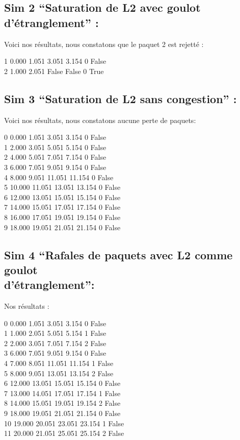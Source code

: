 \documentclass[a4paper, 12pt]{report}
\begin{document}
\subsection*{Sim 2 “Saturation de L2 avec goulot d’étranglement” :}
Voici nos résultats, nous constatons que le paquet 2 est rejetté :
\begin{center}
1 0.000 1.051 3.051 3.154 0 False\\
2 1.000 2.051 False False 0 True
\end{center}

\subsection*{Sim 3 “Saturation de L2 sans congestion” :}
Voici nos résultats, nous constatons aucune perte de paquets:
\begin{center}
0 0.000 1.051 3.051 3.154 0 False\\
1 2.000 3.051 5.051 5.154 0 False\\
2 4.000 5.051 7.051 7.154 0 False\\
3 6.000 7.051 9.051 9.154 0 False\\
4 8.000 9.051 11.051 11.154 0 False\\
5 10.000 11.051 13.051 13.154 0 False\\
6 12.000 13.051 15.051 15.154 0 False\\
7 14.000 15.051 17.051 17.154 0 False\\
8 16.000 17.051 19.051 19.154 0 False\\
9 18.000 19.051 21.051 21.154 0 False\\
\end{center}

\newpage
\subsection*{Sim 4 “Rafales de paquets avec L2 comme goulot\\ d’étranglement”:}
Nos résultats :
\begin{center}
0 0.000 1.051 3.051 3.154 0 False\\
1 1.000 2.051 5.051 5.154 1 False\\
2 2.000 3.051 7.051 7.154 2 False\\
3 6.000 7.051 9.051 9.154 0 False\\
4 7.000 8.051 11.051 11.154 1 False\\
5 8.000 9.051 13.051 13.154 2 False\\
6 12.000 13.051 15.051 15.154 0 False\\
7 13.000 14.051 17.051 17.154 1 False\\
8 14.000 15.051 19.051 19.154 2 False\\
9 18.000 19.051 21.051 21.154 0 False\\
10 19.000 20.051 23.051 23.154 1 False\\
11 20.000 21.051 25.051 25.154 2 False\\
\end{center} 
\end{document}
